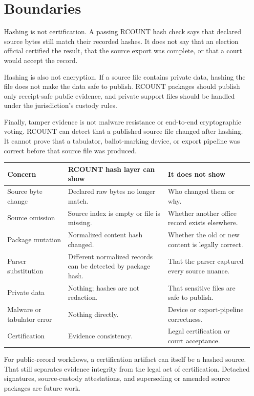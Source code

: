 \section{Boundaries}

Hashing is not certification. A passing RCOUNT hash check says that declared
source bytes still match their recorded hashes. It does not say that an election
official certified the result, that the source export was complete, or that a
court would accept the record.

Hashing is also not encryption. If a source file contains private data, hashing
the file does not make the data safe to publish. RCOUNT packages should publish
only receipt-safe public evidence, and private support files should be handled
under the jurisdiction's custody rules.

Finally, tamper evidence is not malware resistance or end-to-end cryptographic
voting. RCOUNT can detect that a published source file changed after hashing. It
cannot prove that a tabulator, ballot-marking device, or export pipeline was
correct before that source file was produced.

\begin{center}
\small
\begin{tabularx}{\textwidth}{lXX}
\toprule
Concern & RCOUNT hash layer can show & It does not show \\
\midrule
Source byte change & Declared raw bytes no longer match. & Who changed them or why. \\
Source omission & Source index is empty or file is missing. & Whether another office record exists elsewhere. \\
Package mutation & Normalized content hash changed. & Whether the old or new content is legally correct. \\
Parser substitution & Different normalized records can be detected by package hash. & That the parser captured every source nuance. \\
Private data & Nothing; hashes are not redaction. & That sensitive files are safe to publish. \\
Malware or tabulator error & Nothing directly. & Device or export-pipeline correctness. \\
Certification & Evidence consistency. & Legal certification or court acceptance. \\
\bottomrule
\end{tabularx}
\end{center}

For public-record workflows, a certification artifact can itself be a hashed
source. That still separates evidence integrity from the legal act of
certification. Detached signatures, source-custody attestations, and superseding
or amended source packages are future work.
